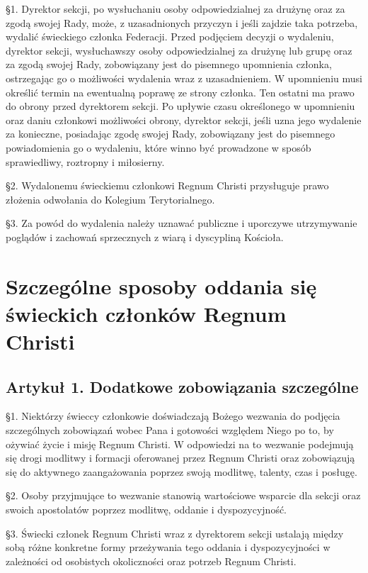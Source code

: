  \S{}1. Dyrektor sekcji, po wysłuchaniu osoby odpowiedzialnej za drużynę oraz za zgodą swojej Rady, może, z uzasadnionych przyczyn i jeśli zajdzie taka potrzeba, wydalić świeckiego członka Federacji. Przed podjęciem decyzji o wydaleniu, dyrektor sekcji, wysłuchawszy osoby odpowiedzialnej za drużynę lub grupę oraz za zgodą swojej Rady, zobowiązany jest do pisemnego upomnienia członka, ostrzegając go o możliwości wydalenia wraz z uzasadnieniem. W upomnieniu musi określić termin na ewentualną poprawę ze strony członka. Ten ostatni ma prawo do obrony przed dyrektorem sekcji. Po upływie czasu określonego w upomnieniu oraz daniu członkowi możliwości obrony, dyrektor sekcji, jeśli uzna jego wydalenie za konieczne, posiadając zgodę swojej Rady, zobowiązany jest do pisemnego powiadomienia go o wydaleniu, które winno być prowadzone w sposób sprawiedliwy, roztropny i miłosierny.

\S{}2. Wydalonemu świeckiemu członkowi Regnum Christi przysługuje prawo złożenia odwołania do Kolegium Terytorialnego.

\S{}3. Za powód do wydalenia należy uznawać publiczne i uporczywe utrzymywanie poglądów i zachowań sprzecznych z wiarą i dyscypliną Kościoła.

\chapter{Szczególne sposoby oddania się świeckich członków Regnum Christi}


\section{Artykuł 1. Dodatkowe zobowiązania szczególne}

 \S{}1. Niektórzy świeccy członkowie doświadczają Bożego wezwania do podjęcia szczególnych zobowiązań wobec Pana i gotowości względem Niego po to, by ożywiać życie i misję Regnum Christi. W odpowiedzi na to wezwanie podejmują się drogi modlitwy i formacji oferowanej przez Regnum Christi oraz zobowiązują się do aktywnego zaangażowania poprzez swoją modlitwę, talenty, czas i posługę.

\S{}2. Osoby przyjmujące to wezwanie stanowią wartościowe wsparcie dla sekcji oraz swoich apostolatów poprzez modlitwę, oddanie i dyspozycyjność.

\S{}3. Świecki członek Regnum Christi wraz z dyrektorem sekcji ustalają między sobą różne konkretne formy przeżywania tego oddania i dyspozycyjności w zależności od osobistych okoliczności oraz potrzeb Regnum Christi.

